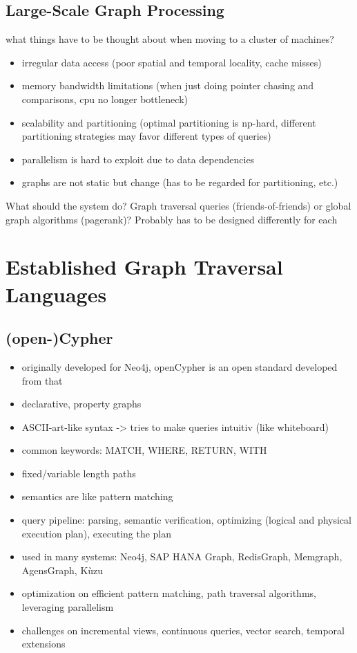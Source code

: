 \documentclass[sigconf,authordraft]{acmart}
\begin{document}
\subsection{Large-Scale Graph Processing}

what things have to be thought about when moving to a cluster of machines?

\begin{itemize}
	\item irregular data access (poor spatial and temporal locality, cache misses)
	\item memory bandwidth limitations (when just doing pointer chasing and comparisons, cpu no longer bottleneck)
	\item scalability and partitioning (optimal partitioning is np-hard, different partitioning strategies may favor different types of queries)
	\item parallelism is hard to exploit due to data dependencies
	\item graphs are not static but change (has to be regarded for partitioning, etc.)
\end{itemize}

What should the system do? Graph traversal queries (friends-of-friends) or global graph algorithms (pagerank)? Probably has to be designed differently for each

\section{Established Graph Traversal Languages}

\subsection{(open-)Cypher}
\begin{itemize}
	\item originally developed for Neo4j, openCypher is an open standard developed from that
	\item declarative, property graphs
	\item ASCII-art-like syntax -> tries to make queries intuitiv (like whiteboard)
	\item common keywords: MATCH, WHERE, RETURN, WITH
	\item fixed/variable length paths
	\item semantics are like pattern matching
	\item query pipeline: parsing, semantic verification, optimizing (logical and physical execution plan), executing the plan
	\item used in many systems: Neo4j, SAP HANA Graph, RedisGraph, Memgraph, AgensGraph, Kùzu

	\item optimization on efficient pattern matching, path traversal algorithms, leveraging parallelism
	\item challenges on incremental views, continuous queries, vector search, temporal extensions
\end{itemize}
\end{document}
